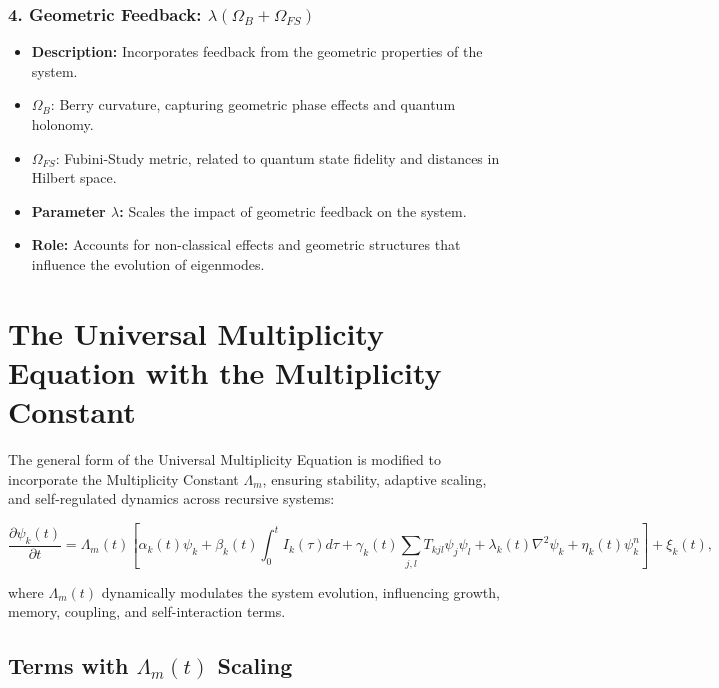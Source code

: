 \documentclass{article}
\theoremstyle{plain}
\begin{document}
\subsubsection{4. Geometric Feedback: \(\lambda (\Omega_B + \Omega_{FS})\)}
\begin{itemize}
    \item \textbf{Description:} Incorporates feedback from the geometric properties of the system.
    \item \(\Omega_B\): Berry curvature, capturing geometric phase effects and quantum holonomy.
    \item \(\Omega_{FS}\): Fubini-Study metric, related to quantum state fidelity and distances in Hilbert space.
    \item \textbf{Parameter \(\lambda\):} Scales the impact of geometric feedback on the system.
    \item \textbf{Role:} Accounts for non-classical effects and geometric structures that influence the evolution of eigenmodes.
\end{itemize}

\section{The Universal Multiplicity Equation with the Multiplicity Constant}

The general form of the Universal Multiplicity Equation is modified to incorporate the Multiplicity Constant \( \Lambda_m \), ensuring stability, adaptive scaling, and self-regulated dynamics across recursive systems:

\begin{equation}
\frac{\partial \psi_k(t)}{\partial t} = \Lambda_m(t) \left[ \alpha_k(t) \psi_k + \beta_k(t) \int_0^t I_k(\tau) d\tau + \gamma_k(t) \sum_{j,l} T_{kjl} \psi_j \psi_l + \lambda_k(t) \nabla^2 \psi_k + \eta_k(t) \psi_k^n \right] + \xi_k(t),
\end{equation}

where \( \Lambda_m(t) \) dynamically modulates the system evolution, influencing growth, memory, coupling, and self-interaction terms.

\subsection{Terms with \( \Lambda_m(t) \) Scaling}
\end{document}
